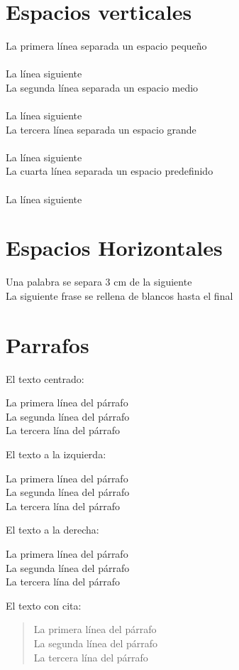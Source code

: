 \documentclass[10pt,a4paper]{article}
\begin{document}
\section{Espacios verticales}
La primera línea separada un espacio pequeño\\
\smallskip
\\La línea siguiente \\
La segunda línea separada un espacio medio \\
\medskip
\\La línea siguiente \\
La tercera línea separada un espacio grande \\
\bigskip
\\La línea siguiente \\
La cuarta línea separada un espacio predefinido \\
\vspace{5cm}
\\La línea siguiente


\section{Espacios Horizontales}
Una palabra se separa 3 cm \hspace{3cm} de la siguiente \\
La siguiente frase se \hfill {rellena de blancos hasta el final} 


\section{Parrafos}
El texto centrado:	
\begin{center}
  La primera línea del párrafo\\
  La segunda línea del párrafo\\ 
  La tercera lína del párrafo\\
\end{center}
El texto a la izquierda:
\begin{flushleft}
  La primera línea del párrafo \vspace{1.5cm} \\
  La segunda línea del párrafo\\ 
  La tercera lína del párrafo\\
\end{flushleft}
El texto a la derecha:

\begin{flushright}
  La primera línea del párrafo\\
  La segunda línea del párrafo\\ 
  La tercera lína del párrafo\\
\end{flushright}
El texto con cita:
\begin{quote}
  La primera línea del párrafo \vspace{5cm} \\
  La segunda línea del párrafo\\ 
  La tercera lína del párrafo\\
\end{quote}
\end{document}

